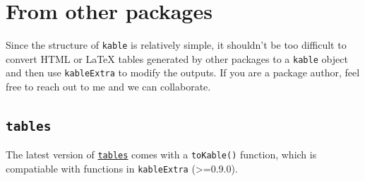 \documentclass[table]{article}
\newenvironment{Shaded}{\begin{snugshade}}{\end{snugshade}}
\newcommand{\CommentTok}[1]{\textcolor[rgb]{0.56,0.35,0.01}{\textit{#1}}}
\newcommand{\DataTypeTok}[1]{\textcolor[rgb]{0.13,0.29,0.53}{#1}}
\newcommand{\DecValTok}[1]{\textcolor[rgb]{0.00,0.00,0.81}{#1}}
\newcommand{\KeywordTok}[1]{\textcolor[rgb]{0.13,0.29,0.53}{\textbf{#1}}}
\newcommand{\NormalTok}[1]{#1}
\newcommand{\OperatorTok}[1]{\textcolor[rgb]{0.81,0.36,0.00}{\textbf{#1}}}
\newcommand{\StringTok}[1]{\textcolor[rgb]{0.31,0.60,0.02}{#1}}
\begin{document}
\begin{Shaded}
\end{Shaded}

\hypertarget{from-other-packages}{%
\section{From other packages}\label{from-other-packages}}

Since the structure of \texttt{kable} is relatively simple, it shouldn't
be too difficult to convert HTML or LaTeX tables generated by other
packages to a \texttt{kable} object and then use \texttt{kableExtra} to
modify the outputs. If you are a package author, feel free to reach out
to me and we can collaborate.

\hypertarget{tables}{%
\subsection{\texorpdfstring{\texttt{tables}}{tables}}\label{tables}}

The latest version of
\href{https://CRAN.R-project.org/package=tables}{\texttt{tables}} comes
with a \texttt{toKable()} function, which is compatiable with functions
in \texttt{kableExtra} (\textgreater{}=0.9.0).
\end{document}
